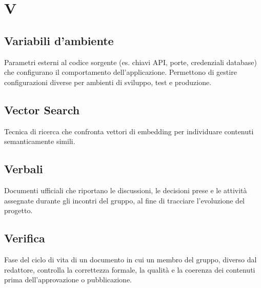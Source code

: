 \documentclass[a4paper, 11pt, oneside]{scrartcl} %
\begin{document}

\section*{V}


\subsection*{Variabili d'ambiente}


Parametri esterni al codice sorgente (es. chiavi API, porte, credenziali database) che configurano il comportamento dell'applicazione. Permettono di gestire configurazioni diverse per ambienti di sviluppo, test e produzione.

\vspace{0.5cm}

\subsection*{Vector Search}
Tecnica di ricerca che confronta vettori di embedding per individuare contenuti semanticamente simili.
\vspace{0.5cm}

\subsection*{Verbali}


Documenti ufficiali che riportano le discussioni, le decisioni prese e le attività assegnate durante gli incontri del gruppo, al fine di tracciare l'evoluzione del progetto.

\vspace{0.5cm}

\subsection*{Verifica}


Fase del ciclo di vita di un documento in cui un membro del gruppo, diverso dal redattore, controlla la correttezza formale, la qualità e la coerenza dei contenuti prima dell'approvazione o pubblicazione.
\end{document}
